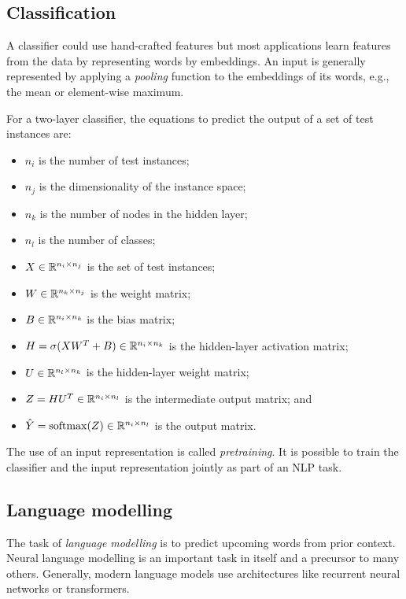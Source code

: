 \subsection{Classification}

A classifier could use hand-crafted features but most applications learn
features from the data by representing words by embeddings.
An input is generally represented by applying a \textit{pooling} function to the
embeddings of its words, e.g., the mean or element-wise maximum.

For a two-layer classifier, the equations to predict the output of a set of test
instances are:
\begin{itemize}
  \item $n_i$ is the number of test instances;
  \item $n_j$ is the dimensionality of the instance space;
  \item $n_k$ is the number of nodes in the hidden layer;
  \item $n_l$ is the number of classes;
  \item $X \in \mathbb{R}^{n_i \times n_j}$ is the set of test instances;
  \item $W \in \mathbb{R}^{n_k \times n_j}$ is the weight matrix;
  \item $B \in \mathbb{R}^{n_i \times n_k}$ is the bias matrix;
  \item $H = \sigma(X W^{T} + B) \in \mathbb{R}^{n_i \times n_k}$
        is the hidden-layer activation matrix;
  \item $U \in \mathbb{R}^{n_l \times n_k}$ is the hidden-layer weight matrix;
  \item $Z = H U^{T} \in \mathbb{R}^{n_i \times n_l}$ is the intermediate output matrix; and
  \item $\hat{Y} = \operatorname{softmax}(Z) \in \mathbb{R}^{n_i \times n_l}$ is the output matrix.
\end{itemize}

The use of an input representation is called \textit{pretraining}.
It is possible to train the classifier and the input representation jointly as
part of an NLP task.

\subsection{Language modelling}

The task of \textit{language modelling} is to predict upcoming words from prior
context.
Neural language modelling is an important task in itself and a precursor to many
others.
Generally, modern language models use architectures like recurrent neural
networks or transformers.

